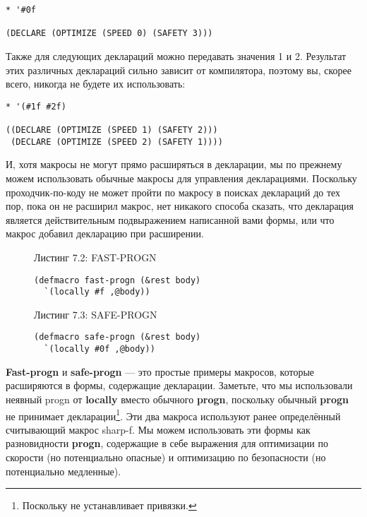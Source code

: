 \begin{verbatim}
* '#0f

(DECLARE (OPTIMIZE (SPEED 0) (SAFETY 3)))
\end{verbatim}

Также для следующих деклараций можно передавать значения 1 и 2. Результат этих различных деклараций сильно зависит от компилятора, поэтому вы, скорее всего, никогда не будете их использовать:

\begin{verbatim}
* '(#1f #2f)

((DECLARE (OPTIMIZE (SPEED 1) (SAFETY 2)))
 (DECLARE (OPTIMIZE (SPEED 2) (SAFETY 1))))
\end{verbatim}

И, хотя макросы не могут прямо расширяться в декларации, мы по прежнему можем использовать обычные макросы для управления декларациями. Поскольку проходчик-по-коду не может пройти по макросу в поисках деклараций до тех пор, пока он не расширил макрос, нет никакого способа сказать, что декларация является действительным подвыражением написанной вами формы, или что макрос добавил декларацию при расширении.

\begin{figure}Листинг 7.2: FAST-PROGN\label{listing_7.2}
\listbegin
\begin{verbatim}
(defmacro fast-progn (&rest body)
  `(locally #f ,@body))
\end{verbatim}
\listend
\end{figure}

\begin{figure}Листинг 7.3: SAFE-PROGN\label{listing_7.3}
\listbegin
\begin{verbatim}
(defmacro safe-progn (&rest body)
  `(locally #0f ,@body))
\end{verbatim}
\listend
\end{figure}

\textbf{Fast-progn} и \textbf{safe-progn} --- это простые примеры макросов, которые расширяются в формы, содержащие декларации. Заметьте, что мы использовали неявный progn от \textbf{locally} вместо обычного \textbf{progn}, поскольку обычный \textbf{progn} не принимает декларации\footnote{Поскольку не устанавливает привязки.}. Эти два макроса используют ранее определённый считывающий макрос sharp-f. Мы можем использовать эти формы как разновидности \textbf{progn}, содержащие в себе выражения для оптимизации по скорости (но потенциально опасные) и оптимизацию по безопасности (но потенциально медленные).

